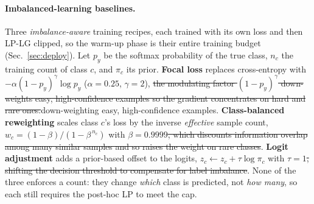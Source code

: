 \documentclass[10pt]{article}
\newcommand{\del}[1]{{\color{red}\sout{#1}}}
\begin{document}
{\color{blue}
\paragraph{Imbalanced-learning baselines.}
Three \emph{imbalance-aware} training recipes, each trained with its own loss and then
LP-LG clipped, so the warm-up phase is their entire training budget
(Sec.~\ref{sec:deploy}). Let $p_y$ be the softmax probability of the true class, $n_c$
the training count of class $c$, and $\pi_c$ its prior. \textbf{Focal loss}
\citep{lin2017focal} replaces cross-entropy with
$-\alpha(1-p_y)^{\gamma}\log p_y$ ($\alpha{=}0.25$, $\gamma{=}2$), \del{the modulating factor
$(1-p_y)^{\gamma}$ down-weights easy, high-confidence examples so the gradient
concentrates on hard and rare ones.}{down-weighting easy, high-confidence examples.} \textbf{Class-balanced reweighting}
\citep{cui2019class} scales class $c$'s loss by the inverse \emph{effective} sample
count, $w_c = (1-\beta)/(1-\beta^{\,n_c})$ with $\beta{=}0.9999$\del{, which discounts
information overlap among many similar samples and so raises the weight on rare classes}.
\textbf{Logit adjustment} \citep{menon2020long} adds a prior-based offset to the logits,
$z_c \leftarrow z_c + \tau\log\pi_c$ with $\tau{=}1$\del{, shifting the decision threshold to
compensate for label imbalance}. None of the three enforces a count: they change
\emph{which} class is predicted, not \emph{how many}, so each still requires the post-hoc
LP to meet the cap.}
\end{document}
